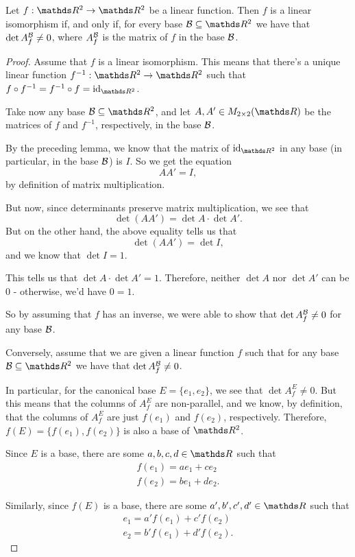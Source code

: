 \begin{theorem}
	Let $f:\R^2\to\R^2$ be a linear function. Then $f$ is a linear isomorphism if, and only if, for every base $\mc B\subseteq \R^2$ we have that $\det A_f^{\mathcal B}\neq0$, where $A_f^{\mathcal B}$ is the matrix of $f$ in the base $\mathcal B$.
\end{theorem}
\begin{proof}
	Assume that $f$ is a linear isomorphism. This means that there's a unique linear function $f^{-1}:\R^2\to \R^2$ such that $f\circ f^{-1}=f^{-1}\circ f=\id_{\R^2}$.
	
	Take now any base $\mc B\subseteq\R^2$, and let $A,A'\in M_{2\times 2}(\R)$ be the matrices of $f$ and $f^{-1}$, respectively, in the base $\mathcal B$.
	
	By the preceding lemma, we know that the matrix of $\id_{\R^2}$ in any base (in particular, in the base $\mathcal B$) is $I$. So we get the equation
	\[AA'=I,\]by definition of matrix multiplication.
	
	But now, since determinants preserve matrix multiplication, we see that
	\[\det(AA')=\det A\cdot \det A'.\] But on the other hand, the above equality tells us that
	\[\det(AA')=\det I,\]and we know that $\det I=1$.
	
	This tells us that $\det A\cdot \det A'=1$. Therefore, neither $\det A$ nor $\det A'$ can be 0 - otherwise, we'd have $0=1$.
	
	So by assuming that $f$ has an inverse, we were able to show that $\det A_f^{\mathcal B}\neq 0$ for any base $\mathcal B$.
	
	\bigskip
	Conversely, assume that we are given a linear function $f$ such that for any base $\mc B\subseteq \R^2$ we have that $\det A_f^{\mathcal B}\neq 0$.
	
	In particular, for the canonical base $E=\{e_1,e_2\}$, we see that $\det A_f^E\neq 0$. But this means that the columns of $A_f^E$ are non-parallel, and we know, by definition, that the columns of $A_f^E$ are just $f(e_1)$ and $f(e_2)$, respectively. Therefore, $f(E)=\{f(e_1),f(e_2)\}$ is also a base of $\R^2$.
	
	Since $E$ is a base, there are some $a,b,c,d\in\R$ such that
	\begin{gather}
		f(e_1)=ae_1+ce_2\\f(e_2)=be_1+de_2.
	\end{gather}
		
	Similarly, since $f(E)$ is a base, there are some $a',b',c',d'\in \R$ such that \begin{gather}
		e_1=a'f(e_1)+c'f(e_2)\\e_2=b'f(e_1)+d'f(e_2).
	\end{gather}
	

\end{proof}
